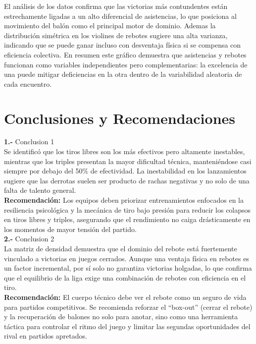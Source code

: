 \documentclass[oneside,11pt]{Latex/Classes/PhDthesisPSnPDF}
\begin{document}
El análisis de los datos confirma que las victorias más contundentes
están estrechamente ligadas a un alto diferencial de asistencias, lo que
posiciona al movimiento del balón como el principal motor de dominio.
Ademas la distribución simétrica en los violines de rebotes sugiere una
alta varianza, indicando que se puede ganar incluso con desventaja
física si se compensa con eficiencia colectiva. En resumen este gráfico
demuestra que asistencias y rebotes funcionan como variables
independientes pero complementarias: la excelencia de una puede mitigar
deficiencias en la otra dentro de la variabilidad aleatoria de cada
encuentro.\newpage

\chapter{Conclusiones y Recomendaciones}

\textbf{1.-} Conclusion 1\\
Se identificó que los tiros libres son los más efectivos pero altamente
inestables, mientras que los triples presentan la mayor dificultad
técnica, manteniéndose casi siempre por debajo del 50\% de efectividad.
La inestabilidad en los lanzamientos sugiere que las derrotas suelen ser
producto de rachas negativas y no solo de una falta de talento
general.\\

\textbf{Recomendación:} Los equipos deben priorizar entrenamientos
enfocados en la resiliencia psicológica y la mecánica de tiro bajo
presión para reducir los colapsos en tiros libres y triples, asegurando
que el rendimiento no caiga drásticamente en los momentos de mayor
tensión del partido.\\

\textbf{2.-} Conclusion 2\\
La matriz de densidad demuestra que el dominio del rebote está
fuertemente vinculado a victorias en juegos cerrados. Aunque una ventaja
física en rebotes es un factor incremental, por sí solo no garantiza
victorias holgadas, lo que confirma que el equilibrio de la liga exige
una combinación de rebotes con eficiencia en el tiro.\\

\textbf{Recomendación:} El cuerpo técnico debe ver el rebote como un
seguro de vida para partidos competitivos. Se recomienda reforzar el
``box-out'' (cerrar el rebote) y la recuperación de balones no solo para
anotar, sino como una herramienta táctica para controlar el ritmo del
juego y limitar las segundas oportunidades del rival en partidos
apretados.\\
\end{document}
